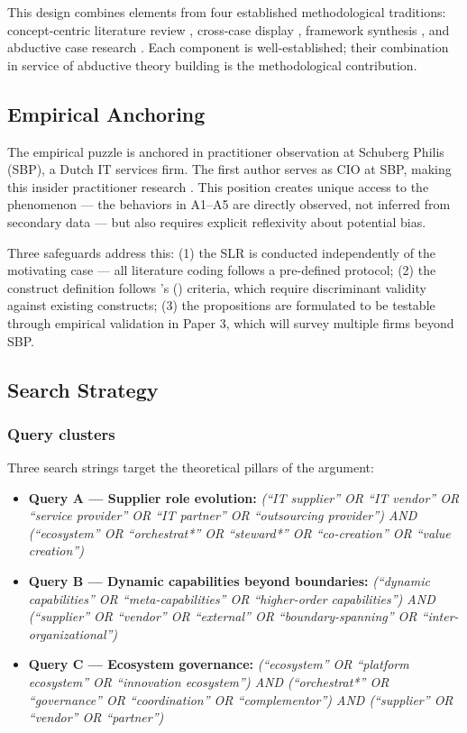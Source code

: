 This design combines elements from four established methodological traditions: concept-centric literature review \citep{WebsterWatson2002}, cross-case display \citep{MilesHuberman1994}, framework synthesis \citep{Carroll2013}, and abductive case research \citep{DuboisGadde2002}. Each component is well-established; their combination in service of abductive theory building is the methodological contribution.

\subsection{Empirical Anchoring}

The empirical puzzle is anchored in practitioner observation at Schuberg Philis (SBP), a Dutch IT services firm. The first author serves as CIO at SBP, making this insider practitioner research \citep{BrannickCoghlan2007}. This position creates unique access to the phenomenon --- the behaviors in A1--A5 are directly observed, not inferred from secondary data --- but also requires explicit reflexivity about potential bias.

Three safeguards address this: (1) the SLR is conducted independently of the motivating case --- all literature coding follows a pre-defined protocol; (2) the construct definition follows \citeauthor{Suddaby2010}'s (\citeyear{Suddaby2010}) criteria, which require discriminant validity against existing constructs; (3) the propositions are formulated to be testable through empirical validation in Paper 3, which will survey multiple firms beyond SBP.

\subsection{Search Strategy}

\subsubsection{Query clusters}

Three search strings target the theoretical pillars of the argument:

\begin{itemize}
    \item \textbf{Query A --- Supplier role evolution:} \textit{(``IT supplier'' OR ``IT vendor'' OR ``service provider'' OR ``IT partner'' OR ``outsourcing provider'') AND (``ecosystem'' OR ``orchestrat*'' OR ``steward*'' OR ``co-creation'' OR ``value creation'')}
    \item \textbf{Query B --- Dynamic capabilities beyond boundaries:} \textit{(``dynamic capabilities'' OR ``meta-capabilities'' OR ``higher-order capabilities'') AND (``supplier'' OR ``vendor'' OR ``external'' OR ``boundary-spanning'' OR ``inter-organizational'')}
    \item \textbf{Query C --- Ecosystem governance:} \textit{(``ecosystem'' OR ``platform ecosystem'' OR ``innovation ecosystem'') AND (``orchestrat*'' OR ``governance'' OR ``coordination'' OR ``complementor'') AND (``supplier'' OR ``vendor'' OR ``partner'')}
\end{itemize}


